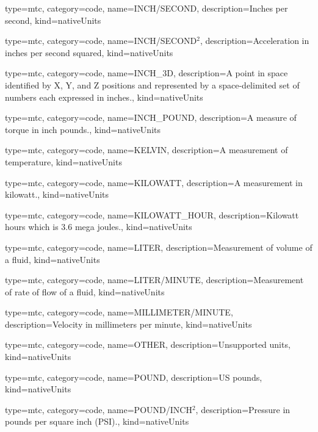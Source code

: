 {
  type=mtc,
  category=code,
  name={INCH/SECOND},
  description={Inches per second},
  kind={nativeUnits}
}


{
  type=mtc,
  category=code,
  name={INCH/SECOND$^2$},
  description={Acceleration in inches per second squared},
  kind={nativeUnits}
}


{
  type=mtc,
  category=code,
  name={INCH\_3D},
  description={A point in space identified by X, Y, and Z positions and represented by a space-delimited set of numbers each expressed in inches.},
  kind={nativeUnits}
}


{
  type=mtc,
  category=code,
  name={INCH\_POUND},
  description={A measure of torque in inch pounds.},
  kind={nativeUnits}
}


{
  type=mtc,
  category=code,
  name={KELVIN},
  description={A measurement of temperature},
  kind={nativeUnits}
}


{
  type=mtc,
  category=code,
  name={KILOWATT},
  description={A measurement in kilowatt.},
  kind={nativeUnits}
}


{
  type=mtc,
  category=code,
  name={KILOWATT\_HOUR},
  description={Kilowatt hours which is 3.6 mega joules.},
  kind={nativeUnits}
}


{
  type=mtc,
  category=code,
  name={LITER},
  description={Measurement of volume of a fluid},
  kind={nativeUnits}
}


{
  type=mtc,
  category=code,
  name={LITER/MINUTE},
  description={Measurement of rate of flow of a fluid},
  kind={nativeUnits}
}


{
  type=mtc,
  category=code,
  name={MILLIMETER/MINUTE},
  description={Velocity in millimeters per minute},
  kind={nativeUnits}
}


{
  type=mtc,
  category=code,
  name={OTHER},
  description={Unsupported units},
  kind={nativeUnits}
}


{
  type=mtc,
  category=code,
  name={POUND},
  description={US pounds},
  kind={nativeUnits}
}


{
  type=mtc,
  category=code,
  name={POUND/INCH$^2$},
  description={Pressure in pounds per square inch (PSI).},
  kind={nativeUnits}
}


